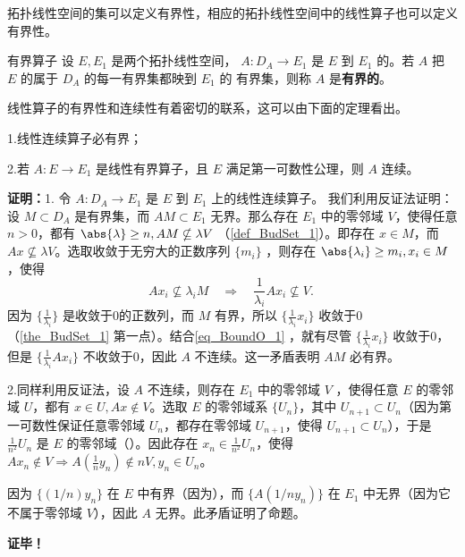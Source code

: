
\begin{issues}
\issueDraft
\end{issues}

拓扑线性空间的集可以定义有界性，相应的拓扑线性空间中的线性算子也可以定义有界性。

\begin{definition}{有界算子}
设 $E,E_1$ 是两个拓扑线性空间， $A:D_A\rightarrow E_1$ 是 $E$ 到 $E_1$ 的。若 $A$ 把 $E$ 的属于 $D_A$ 的每一有界集都映到 $E_1$ 的 有界集，则称 $A$ 是\textbf{有界的}。
\end{definition}

线性算子的有界性和连续性有着密切的联系，这可以由下面的定理看出。

\begin{theorem}{}
1.线性连续算子必有界；

2.若 $A:E\rightarrow E_1$ 是线性有界算子，且 $E$ 满足第一可数性公理，则 $A$ 连续。
\end{theorem}
\textbf{证明：}1. 令 $A:D_A\rightarrow E_1$ 是 $E$ 到 $E_1$ 上的线性连续算子。 我们利用反证法证明：设 $M\subset D_A$ 是有界集，而 $AM\subset E_1$ 无界。那么存在 $E_1$ 中的零邻域 $V$，使得任意 $n>0$，都有 $\abs{\lambda}\geq n,AM\nsubseteq\lambda V$ （\autoref{def_BudSet_1}）。即存在 $x\in M$，而 $Ax\nsubseteq \lambda V$。选取收敛于无穷大的正数序列 $\{m_i\}$ ，则存在 $\abs{\lambda_i}\geq m_i,x_i\in M$，使得 
\begin{equation}\label{eq_BoundO_1}
Ax_i\nsubseteq \lambda_iM\quad\Rightarrow\quad \frac{1}{\lambda_i}A x_i\nsubseteq V. ~
\end{equation}
因为 $\{\frac{1}{\lambda_i}\}$ 是收敛于0的正数列，而 $M$ 有界，所以 $\{\frac{1}{\lambda_i}x_i\}$ 收敛于0（\autoref{the_BudSet_1} 第一点）。结合\autoref{eq_BoundO_1} ，就有尽管 $\{\frac{1}{\lambda_i}x_i\}$ 收敛于0，但是 $\{\frac{1}{\lambda_i}A x_i\}$ 不收敛于0，因此 $A$ 不连续。这一矛盾表明 $AM$ 必有界。

2.同样利用反证法，设 $A$ 不连续，则存在 $E_1$ 中的零邻域 $V$ ，使得任意 $E$ 的零邻域 $U$，都有 $x\in U,Ax\notin V$。选取 $E$ 的零邻域系 $\{U_n\}$，其中 $U_{n+1}\subset U_n$（因为第一可数性保证任意零邻域 $U_n$，都存在零邻域 $U_{n+1}$，使得 $U_{n+1}\subset U_n$），于是 $\frac{1}{n^2} U_n$ 是 $E$ 的零邻域（）。因此存在 $x_n\in \frac{1}{n^2}U_n$，使得 $Ax_n\notin V\Rightarrow A (\frac{1}{n}y_n)\notin n V,y_n\in U_n$。

因为 $\{(1/n) y_n\}$ 在 $E$ 中有界（因为），而 $\{A(1/n y_n)\}$ 在 $E_1$ 中无界（因为它不属于零邻域 $V$），因此 $A$ 无界。此矛盾证明了命题。

 
\textbf{证毕！}


